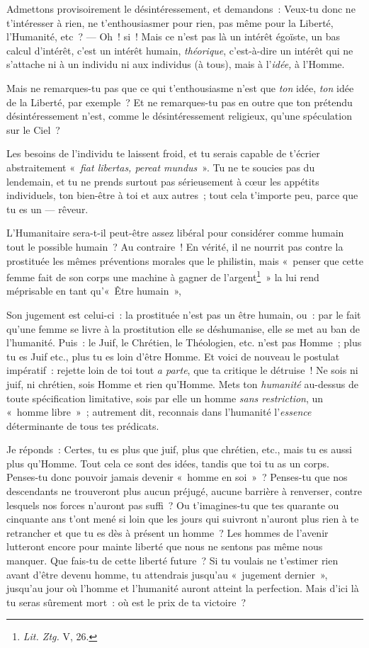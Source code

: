 \documentclass[french,twoside]{book} %
\begin{document}
\noindent Admettons provisoirement le désintéressement, et demandons : Veux-tu donc ne t’intéresser à rien, ne t’enthousiasmer pour rien, pas même pour la Liberté, l’Humanité, etc ? — Oh ! si ! Mais ce n’est pas là un intérêt égoïste, un bas calcul d’intérêt, c’est un intérêt humain, \emph{théorique}, c’est-à-dire un intérêt qui ne s’attache ni à un individu ni aux individus (à tous), mais à l’\emph{idée,} à l’Homme.\par
Mais ne remarques-tu pas que ce qui t’enthousiasme n’est que \emph{ton} idée, \emph{ton} idée de la Liberté, par exemple ? Et ne remarques-tu pas en outre que ton prétendu désintéressement n’est, comme le désintéressement religieux, qu’une spéculation sur le Ciel ?\par
Les besoins de l’individu te laissent froid, et tu serais capable de t’écrier abstraitement « \emph{fiat libertas, pereat mundus} ». Tu ne te soucies pas du lendemain, et tu ne prends surtout pas sérieusement à cœur les appétits individuels, ton bien-être à toi et aux autres ; tout cela t’importe peu, parce que tu es un — rêveur.\par
L’Humanitaire sera-t-il peut-être assez libéral pour considérer comme humain tout le possible humain ? Au contraire ! En vérité, il ne nourrit pas contre la prostituée les mêmes préventions morales que le philistin, mais « penser que cette femme fait de son  corps une machine à gagner de l’argent\footnote{ \noindent \emph{Lit. Ztg.} V, 26.
 } » la lui rend méprisable en tant qu’« Être humain »,\par
Son jugement est celui-ci : la prostituée n’est pas un être humain, ou : par le fait qu’une femme se livre à la prostitution elle se déshumanise, elle se met au ban de l’humanité. Puis : le Juif, le Chrétien, le Théologien, etc. n’est pas Homme ; plus tu es Juif etc., plus tu es loin d’être Homme. Et voici de nouveau le postulat impératif : rejette loin de toi tout \emph{a parte}, que ta critique le détruise ! Ne sois ni juif, ni chrétien, sois Homme et rien qu’Homme. Mets ton \emph{humanité} au-dessus de toute spécification limitative, sois par elle un homme \emph{sans restriction}, un « homme libre » ; autrement dit, reconnais dans l’humanité l’\emph{essence} déterminante de tous tes prédicats.\par
Je réponds : Certes, tu es plus que juif, plus que chrétien, etc., mais tu es aussi plus qu’Homme. Tout cela ce sont des idées, tandis que toi tu as un corps. Penses-tu donc pouvoir jamais devenir « homme en soi » ? Penses-tu que nos descendants ne trouveront plus aucun préjugé, aucune barrière à renverser, contre lesquels nos forces n’auront pas suffi ? Ou t’imagines-tu que tes quarante ou cinquante ans t’ont mené si loin que les jours qui suivront n’auront plus rien à te retrancher et que tu es dès à présent un homme ? Les hommes de l’avenir lutteront encore pour mainte liberté que nous ne sentons pas même nous manquer. Que fais-tu de cette liberté future ? Si tu voulais ne t’estimer rien avant d’être devenu homme, tu attendrais jusqu’au « jugement dernier », jusqu’au jour où l’homme et l’humanité auront atteint la perfection. Mais d’ici là tu seras sûrement mort : où est le prix de ta victoire ?\par
\end{document}
